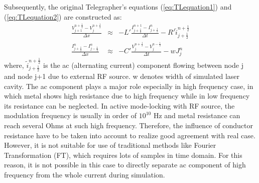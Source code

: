 \documentclass[11pt,final]{scrbook}
\begin{document}
Subsequently, the original Telegrapher's equations (\ref{eq:TLequation1}) and (\ref{eq:TLequation2}) are constructed as:
\begin{eqnarray}
\frac { { V }_{ j+1 }^{ n+\frac{1}{2} }-{ V }_{ j }^{ n+\frac{1}{2} } }{ \Delta x } & \approx & -L'\frac { { I }_{ j+\frac{1}{2} }^{ n+1 }-{ I }_{ j+\frac{1}{2} }^{ n } }{ \Delta t } -R' \widetilde{ i } _{ j+\frac{1}{2} }^{ n+\frac{1}{2} } \label{eq:TLequation3}\\
\frac{{ I }_{ j+\frac{1}{2} }^{ n } - { I }_{ j-\frac{1}{2} }^{ n }}{\Delta x} & \approx & -C'\frac {{ V }_{ j }^{ n+\frac{1}{2} }-{ V }_{ j }^{ n-\frac{1}{2} }}{ \Delta t }-w{J}_{j}^{n} \label{eq:TLequation4}
\end{eqnarray}
where, $ \widetilde{ i } _{ j+\frac{1}{2} }^{ n+\frac{1}{2} }$ is the ac (alternating current) component flowing between node j and node j+1 due to external RF source. w denotes width of simulated laser cavity. The ac component plays a major role especially in high frequency case, in which metal shows high resistance due to high frequency while in low frequency its resistance can be neglected. In active mode-locking with RF source, the modulation frequency is usually in order of $10^{10}$ Hz and metal resistance can reach several Ohms at such high frequency. Therefore, the influence of conductor resistance have to be taken into account to realize good agreement with real case. However, it is not suitable for use of traditional methods like Fourier Transformation (FT), which requires lots of samples in time domain. For this reason, it is not possible in this case to directly separate ac component of high frequency from the whole current during simulation.
\end{document}
